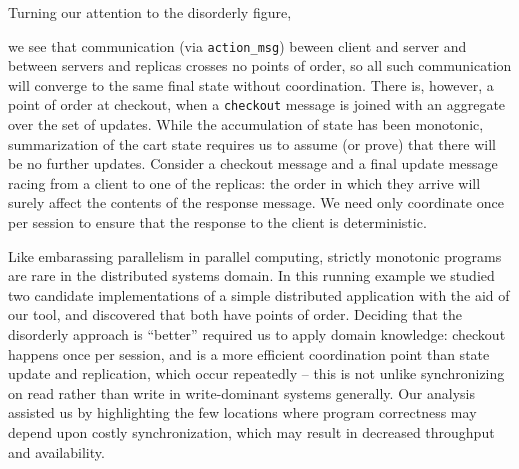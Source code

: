 Turning our attention to the disorderly figure,

we see that communication (via \texttt{action\_msg}) beween client and server
and between servers and replicas crosses no points of order, so all such
communication will converge to the same final state without coordination.
There is, however, a point of order at checkout, when a \texttt{checkout}
message is joined with an aggregate over the set of updates.  While the 
accumulation of state has been monotonic, summarization of the cart state
requires us to assume (or prove) that there will be no further updates.
Consider a checkout message and a final update message racing from a client
to one of the replicas: the order in which they arrive will surely affect
the contents of the response message.  
We need only coordinate once per session to
ensure that the response to the client is deterministic.

Like embarassing parallelism in parallel computing, strictly monotonic programs
are rare in the distributed systems domain.  In this running example we studied
two candidate implementations of a simple distributed application with the aid of
our tool, and discovered that both have points of order.  Deciding that the disorderly
approach is ``better'' required us to apply domain knowledge: checkout happens
once per session, and is a more efficient coordination point than state update and replication, 
which occur repeatedly -- this is not unlike synchronizing on read rather than write 
in write-dominant systems generally.  Our analysis assisted us by highlighting the few locations where program correctness may depend upon costly synchronization, which may
result in decreased throughput and availability.  